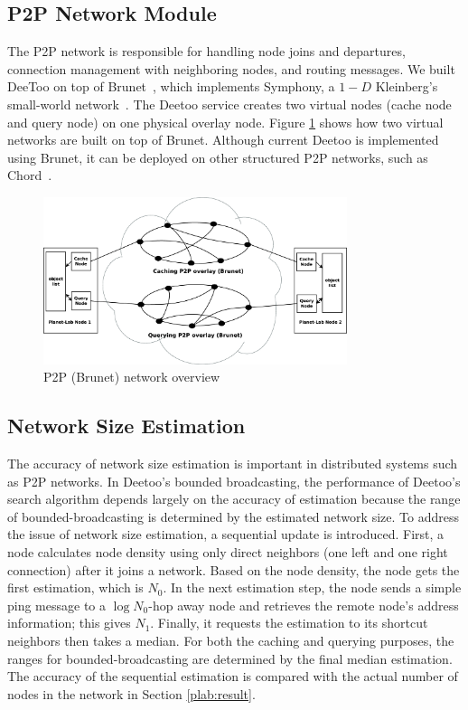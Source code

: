 \documentclass[9.5pt,journal,final,finalsubmission,twocolumn]{IEEEtran}
\begin{document}
\subsection{P2P Network Module}
The P2P network is responsible for handling node joins and departures, connection management with neighboring nodes, and routing messages. 
We built DeeToo on top of Brunet~\cite{brunet}, which implements Symphony, a $1-D$ Kleinberg's small-world network~\cite{small_world_network}. 
The Deetoo service creates two virtual nodes (cache node and query node) on one physical overlay node.
Figure \ref{fig:brunet} shows how two virtual networks are built on top of Brunet.
Although current Deetoo is implemented using Brunet, it can be deployed on other structured P2P networks, such as Chord~\cite{chord}.
\begin{figure}
\centering
\includegraphics[width=3.5in]{brunet.eps}
\caption{P2P (Brunet) network overview} \label{fig:brunet}
\end{figure}

\subsection{Network Size Estimation}
The accuracy of network size estimation is important in distributed systems
such as P2P networks. In Deetoo's bounded broadcasting,
the performance of Deetoo's search algorithm depends largely on the 
accuracy of estimation because the range of bounded-broadcasting is 
determined by the estimated network size. 
To address the issue of network size estimation, a sequential update is 
introduced. First, a node calculates node density using only direct 
neighbors (one left and one right connection) after it joins a network. 
Based on the node density, the node gets the first estimation, which is 
$N_0$.
In the next estimation step, the node sends a simple ping message
to a $\log{N_0}$-hop away node and retrieves the remote node's address 
information; this gives $N_1$. 
Finally, it requests the estimation to its shortcut
neighbors then takes a median. For both the caching and querying purposes, 
the ranges for bounded-broadcasting are determined by the final median 
estimation. The accuracy of the sequential estimation is compared with the 
actual number of nodes in the network in 
Section \ref{plab:result}.
\end{document}
